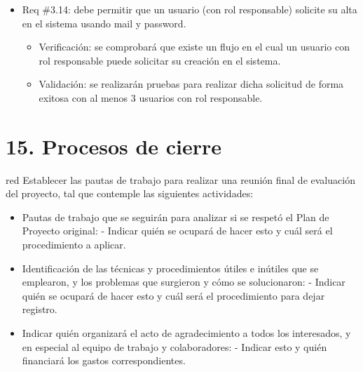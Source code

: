 \documentclass[
11pt, %
codirector, %
]{charter}
\begin{document}
\begin{itemize}
\begin{itemize}
	\item Req \#3.14: debe permitir que un usuario (con rol responsable) solicite su alta en el sistema usando mail y password.
		\begin{itemize}
		\item Verificación: se comprobará que existe un flujo en el cual un usuario con rol responsable puede solicitar su creación en el sistema.
		\item Validación: se realizarán pruebas para realizar dicha solicitud de forma exitosa con al menos 3 usuarios con rol responsable.\\
		\end{itemize}
		
\end{itemize}
\end{itemize}

\section{15. Procesos de cierre}    
\label{sec:cierre}

\begin{consigna}{red}
Establecer las pautas de trabajo para realizar una reunión final de evaluación del proyecto, tal que contemple las siguientes actividades:

\begin{itemize}
	\item Pautas de trabajo que se seguirán para analizar si se respetó el Plan de Proyecto original:
	 - Indicar quién se ocupará de hacer esto y cuál será el procedimiento a aplicar. 
	\item Identificación de las técnicas y procedimientos útiles e inútiles que se emplearon, y los problemas que surgieron y cómo se solucionaron:
	 - Indicar quién se ocupará de hacer esto y cuál será el procedimiento para dejar registro.
	\item Indicar quién organizará el acto de agradecimiento a todos los interesados, y en especial al equipo de trabajo y colaboradores:
	  - Indicar esto y quién financiará los gastos correspondientes.
\end{itemize}

\end{consigna}
\end{document}
